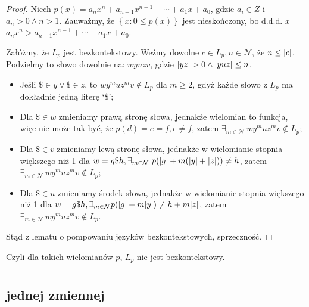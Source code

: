 \documentclass{article}
\theoremstyle{definition}
\theoremstyle{remark}
\begin{document}
\begin{proof}

Niech \(p(x)=a_n x^n + a_{n-1}x^{n-1} + \cdots + a_1x + a_0\), gdzie \(a_i \in Z\) i \(a_n > 0 \land n>1\).
Zauważmy, że \(\left\{ x: 0 \leq p(x) \right\}\) jest nieskończony,
bo d.d.d. \(x\) \(a_n x^n > a_{n-1}x^{n-1} + \cdots + a_1x + a_0\).

Załóżmy, że \(L_p\) jest bezkontekstowy. Weźmy dowolne \(c \in L_p, n \in \mathcal{N}\),
że \(n \leq \abs{c}\).
Podzielmy to słowo dowolnie na:
\(w y u z v\), gdzie \(\abs{yz} > 0 \land \abs{yuz} \leq n\).

\begin{itemize}

\item Jeśli \(\$ \in y \lor \$ \in z\), to \(w y^m u z^m v \not \in L_p\) dla \(m \geq 2\), gdyż każde słowo
z \(L_p\) ma dokładnie jedną literę `\$';

\item Dla \(\$ \in w\) zmieniamy prawą stronę słowa, jednakże wielomian to funkcja,
więc nie może tak być, że \(p(d)=e=f, e \neq f\),
zatem \(\exists_{m \in \mathcal{N}} \ w y^m u z^m v \not \in L_p\);

\item Dla \(\$ \in v\) zmieniamy lewą stronę słowa, jednakże w wielomianie stopnia większego niż 1
dla \(w = g \$ h, \exists_{m \in \mathcal{N}} \ p(\abs{g} + m(\abs{y} + \abs{z})) \neq h\),
zatem \(\exists_{m \in \mathcal{N}} \ w y^m u z^m v \not \in L_p\);

\item Dla \(\$ \in u\) zmieniamy środek słowa, jednakże w wielomianie stopnia większego niż 1
dla \(w = g \$ h, \exists_{m \in \mathcal{N}} p(\abs{g} + m \abs{y}) \neq h + m \abs{z}\),
zatem \(\exists_{m \in \mathcal{N}} \ w y^m u z^m v \not \in L_p\).

\end{itemize}

Stąd z lematu o pompowaniu języków bezkontekstowych, sprzeczność.

\end{proof}

Czyli dla takich wielomianów \(p\), \(L_p\) nie jest bezkontekstowy.

\section{}

\subsection{jednej zmiennej}
\end{document}
